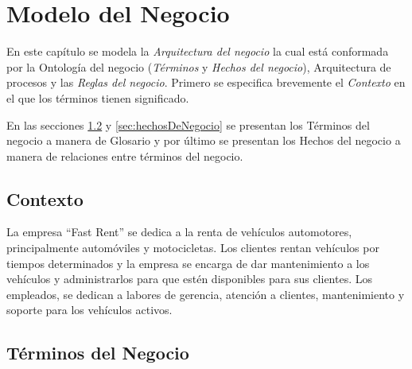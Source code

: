 \chapter{Modelo del Negocio}	
\label{cap:reqSist}

	En este capítulo se modela la {\em Arquitectura del negocio} la cual está conformada por la Ontología del negocio ({\em Términos} y {\em Hechos del negocio}), Arquitectura de procesos y las {\em Reglas del negocio}. Primero se especifica brevemente el {\em Contexto} en el que los términos tienen significado.
	
	En las secciones \ref{sec:terminosDeNegocio} y \ref{sec:hechosDeNegocio} se presentan los Términos del negocio a manera de Glosario y por último se presentan los Hechos del negocio a manera de relaciones entre términos del negocio.

\section{Contexto}

	La empresa ``Fast Rent'' se dedica a la renta de vehículos automotores, principalmente automóviles y motocicletas. Los clientes rentan vehículos por tiempos determinados y la empresa se encarga de dar mantenimiento a los vehículos y administrarlos para que estén disponibles para sus clientes. Los empleados, se dedican a labores de gerencia, atención a clientes, mantenimiento y soporte para los vehículos activos.
	
\section{Términos del Negocio}
\label{sec:terminosDeNegocio}

